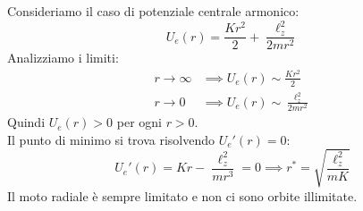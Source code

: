 \begin{example}
    Consideriamo il caso di potenziale centrale armonico:
    \begin{equation}
        U_e(r) = \frac{K r^2}{2} + \frac{\ell_z^2}{2 m r^2}
    \end{equation}
    Analizziamo i limiti:
    \begin{align*}
        r \to \infty &\implies U_e(r) \sim \frac{K r^2}{2} \\
        r \to 0 &\implies U_e(r) \sim \frac{\ell_z^2}{2 m r^2}
    \end{align*}
    Quindi $U_e(r) > 0$ per ogni $r > 0$.\\
    Il punto di minimo si trova risolvendo $U_e'(r) = 0$:
    \begin{equation*}
        U_e'(r) = K r - \frac{\ell_z^2}{m r^3} = 0 \implies r^* = \sqrt{ \frac{\ell_z^2}{mK} }
    \end{equation*}
    Il moto radiale è sempre limitato e non ci sono orbite illimitate.
\end{example}



